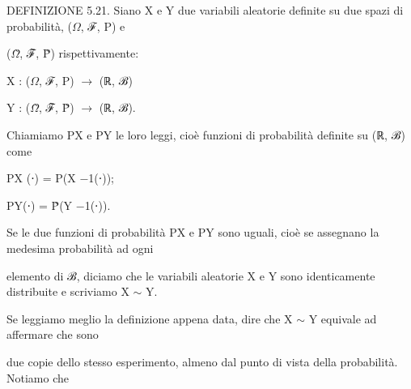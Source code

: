 \documentclass[a4paper,portrait,12pt]{article}
\begin{document}
\begin{flushleft}
DEFINIZIONE 5.21. Siano X e Y due variabili aleatorie definite su due spazi di probabilit\`{a}, ($\Omega$, ℱ, P) e
\end{flushleft}


\begin{flushleft}
($\Omega$̃, ℱ̃, P̃) rispettivamente:
\end{flushleft}


\begin{flushleft}
X : ($\Omega$, ℱ, P) $\rightarrow$ (ℝ, ℬ)
\end{flushleft}


\begin{flushleft}
Y : ($\Omega$̃, ℱ̃, P̃) $\rightarrow$ (ℝ, ℬ).
\end{flushleft}


\begin{flushleft}
Chiamiamo PX e PY le loro leggi, cio\`{e} funzioni di probabilit\`{a} definite su (ℝ, ℬ) come
\end{flushleft}


\begin{flushleft}
PX (⋅) = P(X $-$1(⋅));
\end{flushleft}





\begin{flushleft}
PY(⋅) = P̃(Y $-$1(⋅)).
\end{flushleft}





\begin{flushleft}
Se le due funzioni di probabilit\`{a} PX e PY sono uguali, cio\`{e} se assegnano la medesima probabilit\`{a} ad ogni
\end{flushleft}


\begin{flushleft}
elemento di ℬ, diciamo che le variabili aleatorie X e Y sono identicamente distribuite e scriviamo X $\sim$ Y.
\end{flushleft}


\begin{flushleft}
Se leggiamo meglio la definizione appena data, dire che X $\sim$ Y equivale ad affermare che sono
\end{flushleft}


\begin{flushleft}
due copie dello stesso esperimento, almeno dal punto di vista della probabilit\`{a}. Notiamo che
\end{flushleft}
\end{document}
